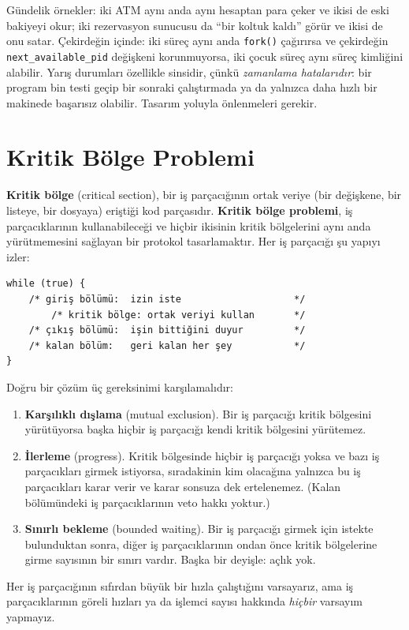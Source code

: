 \documentclass[11pt,a4paper]{article}
\newcommand{\term}[1]{\textbf{\color{mintdeep}#1}}
\newcommand{\cmd}[1]{\texttt{#1}}
\begin{document}
Gündelik örnekler: iki ATM aynı anda aynı hesaptan para çeker ve ikisi de eski bakiyeyi okur; iki rezervasyon sunucusu da ``bir koltuk kaldı'' görür ve ikisi de onu satar. Çekirdeğin içinde: iki süreç aynı anda \cmd{fork()} çağırırsa ve çekirdeğin \texttt{next\_available\_pid} değişkeni korunmuyorsa, iki çocuk süreç aynı süreç kimliğini alabilir. Yarış durumları özellikle sinsidir, çünkü \emph{zamanlama hatalarıdır}: bir program bin testi geçip bir sonraki çalıştırmada ya da yalnızca daha hızlı bir makinede başarısız olabilir. Tasarım yoluyla önlenmeleri gerekir.

\section{Kritik Bölge Problemi}
\label{sec:cs}

\term{Kritik bölge} (critical section), bir iş parçacığının ortak veriye (bir değişkene, bir listeye, bir dosyaya) eriştiği kod parçasıdır. \term{Kritik bölge problemi}, iş parçacıklarının kullanabileceği ve hiçbir ikisinin kritik bölgelerini aynı anda yürütmemesini sağlayan bir protokol tasarlamaktır. Her iş parçacığı şu yapıyı izler:

\begin{lstlisting}
while (true) {
    /* giriş bölümü:  izin iste                    */
        /* kritik bölge: ortak veriyi kullan       */
    /* çıkış bölümü:  işin bittiğini duyur         */
    /* kalan bölüm:   geri kalan her şey           */
}
\end{lstlisting}

Doğru bir çözüm üç gereksinimi karşılamalıdır:
\begin{enumerate}[leftmargin=1.4em]
  \item \textbf{Karşılıklı dışlama} (mutual exclusion). Bir iş parçacığı kritik bölgesini yürütüyorsa başka hiçbir iş parçacığı kendi kritik bölgesini yürütemez.
  \item \textbf{İlerleme} (progress). Kritik bölgesinde hiçbir iş parçacığı yoksa ve bazı iş parçacıkları girmek istiyorsa, sıradakinin kim olacağına yalnızca bu iş parçacıkları karar verir ve karar sonsuza dek ertelenemez. (Kalan bölümündeki iş parçacıklarının veto hakkı yoktur.)
  \item \textbf{Sınırlı bekleme} (bounded waiting). Bir iş parçacığı girmek için istekte bulunduktan sonra, diğer iş parçacıklarının ondan önce kritik bölgelerine girme sayısının bir sınırı vardır. Başka bir deyişle: açlık yok.
\end{enumerate}
Her iş parçacığının sıfırdan büyük bir hızla çalıştığını varsayarız, ama iş parçacıklarının göreli hızları ya da işlemci sayısı hakkında \emph{hiçbir} varsayım yapmayız.
\end{document}
